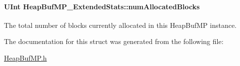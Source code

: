 \paragraph[{num\-Allocated\-Blocks}]{\setlength{\rightskip}{0pt plus 5cm}U\-Int Heap\-Buf\-M\-P\-\_\-\-Extended\-Stats\-::num\-Allocated\-Blocks}\label{struct_heap_buf_m_p___extended_stats_a757dc392845103b1e5b31ab02d17bef5}
The total number of blocks currently allocated in this Heap\-Buf\-M\-P instance. 

The documentation for this struct was generated from the following file\-:\begin{DoxyCompactItemize}
\item 
\hyperlink{_heap_buf_m_p_8h}{Heap\-Buf\-M\-P.\-h}\end{DoxyCompactItemize}
